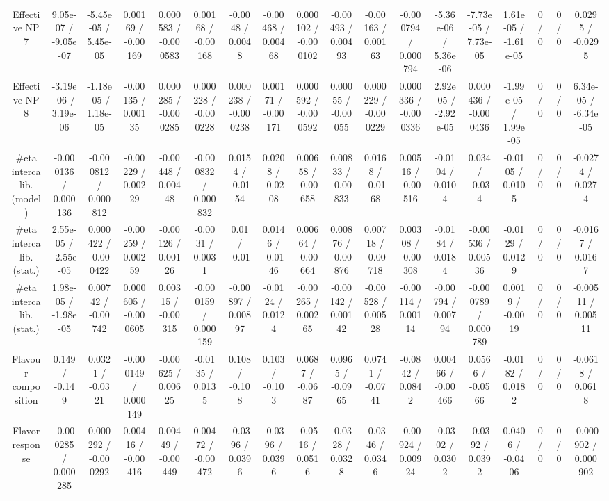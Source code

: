 \documentclass[10pt]{article}
\begin{document}
\begin{table}[htbp]
\begin{center}
\begin{tabular}{|c|c|c|c|c|c|c|c|c|c|c|c|c|c|c|c|c|c|}
  Effective NP 7 & 9.05e-07 / -9.05e-07 & -5.45e-05 / 5.45e-05 & 0.00169 / -0.00169 & 0.000583 / -0.000583 & 0.00168 / -0.00168 & -0.0048 / 0.0048 & -0.00468 / 0.00468 & 0.000102 / -0.000102 & -0.00493 / 0.00493 & -0.00163 / 0.00163 & -0.000794 / 0.000794 & -5.36e-06 / 5.36e-06 & -7.73e-05 / 7.73e-05 & 1.61e-05 / -1.61e-05 & 0 / 0 & 0 / 0 & 0.0295 / -0.0295 \\ 
  Effective NP 8 & -3.19e-06 / 3.19e-06 & -1.18e-05 / 1.18e-05 & -0.00135 / 0.00135 & 0.000285 / -0.000285 & 0.000228 / -0.000228 & 0.000238 / -0.000238 & 0.00171 / -0.00171 & 0.000592 / -0.000592 & 0.00055 / -0.00055 & 0.000229 / -0.000229 & 0.000336 / -0.000336 & 2.92e-05 / -2.92e-05 & 0.000436 / -0.000436 & -1.99e-05 / 1.99e-05 & 0 / 0 & 0 / 0 & 6.34e-05 / -6.34e-05 \\ 
  #eta intercalib. (model) & -0.000136 / 0.000136 & -0.000812 / 0.000812 & -0.00229 / 0.00229 & -0.00448 / 0.00448 & -0.000832 / 0.000832 & 0.0154 / -0.0154 & 0.0208 / -0.0208 & 0.00658 / -0.00658 & 0.00833 / -0.00833 & 0.0168 / -0.0168 & 0.00516 / -0.00516 & -0.0104 / 0.0104 & 0.034 / -0.034 & -0.0105 / 0.0105 & 0 / 0 & 0 / 0 & -0.0274 / 0.0274 \\ 
  #eta intercalib. (stat.) & 2.55e-05 / -2.55e-05 & 0.000422 / -0.000422 & -0.00259 / 0.00259 & -0.00126 / 0.00126 & -0.0031 / 0.0031 & 0.01 / -0.01 & 0.0146 / -0.0146 & 0.00664 / -0.00664 & 0.00876 / -0.00876 & 0.00718 / -0.00718 & 0.00308 / -0.00308 & -0.0184 / 0.0184 & -0.00536 / 0.00536 & -0.0129 / 0.0129 & 0 / 0 & 0 / 0 & -0.0167 / 0.0167 \\ 
  #eta intercalib. (stat.) & 1.98e-05 / -1.98e-05 & 0.00742 / -0.00742 & 0.000605 / -0.000605 & 0.00315 / -0.00315 & -0.000159 / 0.000159 & -0.00897 / 0.00897 & -0.0124 / 0.0124 & -0.00265 / 0.00265 & -0.00142 / 0.00142 & -0.00528 / 0.00528 & -0.00114 / 0.00114 & -0.00794 / 0.00794 & -0.000789 / 0.000789 & 0.0019 / -0.0019 & 0 / 0 & 0 / 0 & -0.00511 / 0.00511 \\ 
  Flavour composition & 0.149 / -0.149 & 0.0321 / -0.0321 & -0.000149 / 0.000149 & -0.00625 / 0.00625 & -0.0135 / 0.0135 & 0.108 / -0.108 & 0.103 / -0.103 & 0.0687 / -0.0687 & 0.0965 / -0.0965 & 0.0741 / -0.0741 & -0.0842 / 0.0842 & 0.00466 / -0.00466 & 0.0566 / -0.0566 & -0.0182 / 0.0182 & 0 / 0 & 0 / 0 & -0.0618 / 0.0618 \\ 
  Flavor response & -0.000285 / 0.000285 & 0.000292 / -0.000292 & 0.00416 / -0.00416 & 0.00449 / -0.00449 & 0.00472 / -0.00472 & -0.0396 / 0.0396 & -0.0396 / 0.0396 & -0.0516 / 0.0516 & -0.0328 / 0.0328 & -0.0346 / 0.0346 & -0.00924 / 0.00924 & -0.0302 / 0.0302 & -0.0392 / 0.0392 & 0.0406 / -0.0406 & 0 / 0 & 0 / 0 & -0.000902 / 0.000902 \\ 

\end{tabular}
\end{center}
\end{table}
\end{document}
